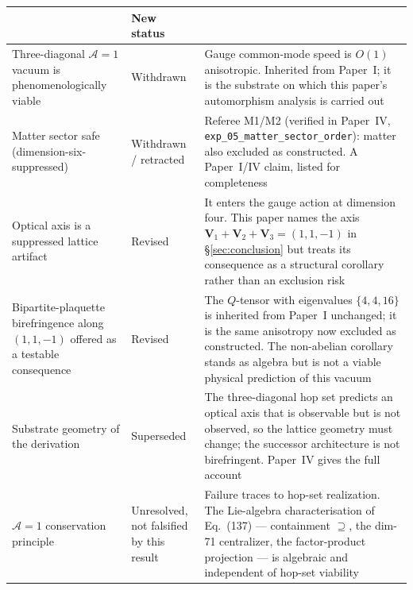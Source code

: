 \begin{center}
\footnotesize
\renewcommand{\arraystretch}{1.15}
\begin{tabular}{@{}p{} p{} p{}@{}}
\toprule
\textbf{\rule{0pt}{2.4ex}Original claim} &
\textbf{New status} &
\textbf{Reason\rule[-1.2ex]{0pt}{0pt}} \\
\midrule
Three-diagonal $\mathcal{A}=1$ vacuum is phenomenologically viable
  & Withdrawn
  & Gauge common-mode speed is $O(1)$ anisotropic.  Inherited from
    Paper~I; it is the substrate on which this paper's automorphism
    analysis is carried out \\
Matter sector safe (dimension-six-suppressed)
  & Withdrawn / retracted
  & Referee M1/M2 (verified in Paper~IV,
    \nolinkurl{exp_05_matter_sector_order}): matter also excluded as
    constructed.  A Paper~I/IV claim, listed for completeness \\
Optical axis is a suppressed lattice artifact
  & Revised
  & It enters the gauge action at dimension four.  This paper names
    the axis $\mathbf{V}_1 + \mathbf{V}_2 + \mathbf{V}_3 = (1,1,-1)$
    in \S\ref{sec:conclusion} but treats its consequence as a
    structural corollary rather than an exclusion risk \\
Bipartite-plaquette birefringence along $(1,1,-1)$ offered as a
testable consequence
  & Revised
  & The $Q$-tensor with eigenvalues $\{4, 4, 16\}$ is inherited from
    Paper~I unchanged; it is the same anisotropy now excluded as
    constructed.  The non-abelian corollary stands as algebra but is
    not a viable physical prediction of this vacuum \\
Substrate geometry of the derivation
  & Superseded
  & The three-diagonal hop set predicts an optical axis that is
    observable but is not observed, so the lattice geometry must
    change; the successor architecture is not birefringent.  Paper~IV
    gives the full account \\
$\mathcal{A}=1$ conservation principle
  & Unresolved, not falsified by this result
  & Failure traces to hop-set realization.  The Lie-algebra
    characterisation of Eq.~(137) --- containment $\supseteq$, the
    dim-71 centralizer, the factor-product projection --- is algebraic
    and independent of hop-set viability \\
\bottomrule
\end{tabular}
\end{center}

\newpage

